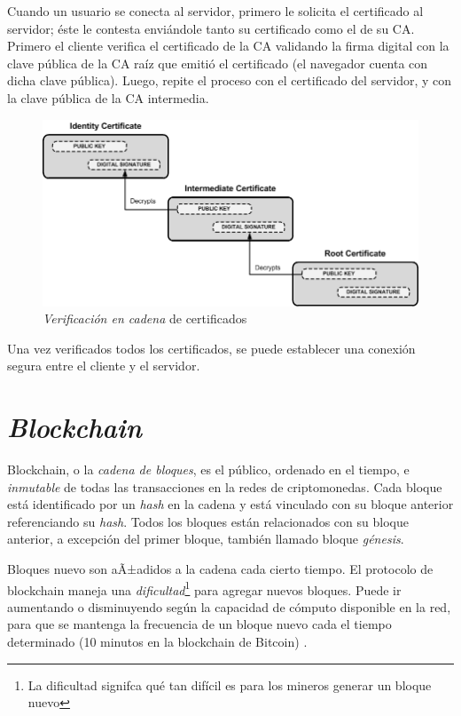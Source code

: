Cuando un usuario se conecta al servidor, primero le solicita el certificado al servidor; éste le contesta enviándole tanto su certificado como el de su CA. Primero el cliente verifica el certificado de la CA validando la firma digital con la clave pública de la CA raíz que emitió el certificado (el navegador cuenta con dicha clave pública). Luego, repite el proceso con el certificado del servidor, y con la clave pública de la CA intermedia.

\begin{figure}[H]
    \centering
    \includegraphics[width=0.8\linewidth]{images/pki-chain-of-trust.png}
    \caption*{\emph{Verificación en cadena} de certificados \autocite{FirenetPKIChainOfTrust}}
\end{figure}

Una vez verificados todos los certificados, se puede establecer una conexión segura entre el cliente y el servidor.

\section{\emph{Blockchain}}

Blockchain, o la \emph{cadena de bloques}, es el  público, ordenado en el tiempo, e \emph{inmutable} de todas las transacciones en la redes de criptomonedas. Cada bloque está identificado por un \emph{hash} en la cadena y está vinculado con su bloque anterior referenciando su \emph{hash}. Todos los bloques están relacionados con su bloque anterior, a excepción del primer bloque, también llamado bloque \emph{génesis}. 

Bloques nuevo son aÃ±adidos a la cadena cada cierto tiempo. El protocolo de blockchain maneja una \emph{dificultad}\footnote{La dificultad signifca qué tan difícil es para los mineros generar un bloque nuevo} para agregar nuevos bloques. Puede ir aumentando o disminuyendo según la capacidad de cómputo disponible en la red, para que se mantenga la frecuencia de un bloque nuevo cada el tiempo determinado (10 minutos en la blockchain de Bitcoin) \autocite{MasteringBlockchainBlockchain}.

